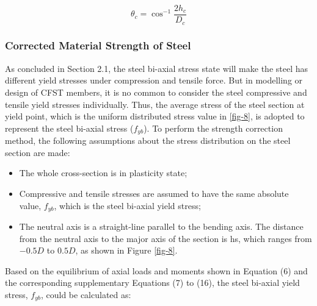 \documentclass[12pt,a4]{article}
\begin{document}
	\begin{equation}\label{eq-5}
	\theta_c = \cos^{-1}{\frac{2h_c}{D_c}}
	\end{equation}
	\par
	\subsubsection{Corrected Material Strength of Steel}
	As concluded in Section 2.1, the steel bi-axial stress state will make the steel has different yield stresses under compression and tensile force. But in modelling or design of CFST members, it is no common to consider the steel compressive and tensile yield stresses individually. Thus, the average stress of the steel section at yield point, which is the uniform distributed stress value in \ref{fig-8}, is adopted to represent the steel bi-axial stress ($f_{yb}$). To perform the strength correction method, the following assumptions about the stress distribution on the steel section are made:
	\begin{itemize}
		\item The whole cross-section is in plasticity state;
		
		\item Compressive and tensile stresses are assumed to have the same absolute value, $f_{yb}$, which is the steel bi-axial yield stress;
		
		\item The neutral axis is a straight-line parallel to the bending axis. The distance from the neutral axis to the major axis of the section is hs, which ranges from $−0.5D$ to $0.5D$, as shown in Figure \ref{fig-8}.
	\end{itemize}
	\par
	Based on the equilibrium of axial loads and moments shown in Equation (6) and the corresponding supplementary Equations (7) to (16), the steel bi-axial yield stress, $f_{yb}$, could be calculated as:
	
\end{document}
